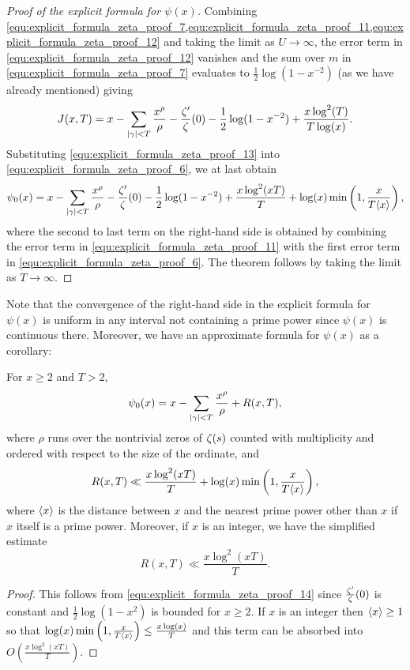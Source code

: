 \begin{proof}[Proof of the explicit formula for $\psi(x)$]
      Combining \cref{equ:explicit_formula_zeta_proof_7,equ:explicit_formula_zeta_proof_11,equ:explicit_formula_zeta_proof_12} and taking the limit as $U \to \infty$, the error term in \cref{equ:explicit_formula_zeta_proof_12} vanishes and the sum over $m$ in \cref{equ:explicit_formula_zeta_proof_7} evaluates to $\frac{1}{2}\log(1-x^{-2})$ (as we have already mentioned) giving
      \begin{equation}\label{equ:explicit_formula_zeta_proof_13}
        J(x,T) = x-\sum_{|\gamma| < T}\frac{x^{\rho}}{\rho}-\frac{\zeta'}{\zeta}(0)-\frac{1}{2}\log(1-x^{-2})+\frac{x\log^{2}(T)}{T\log(x)}.
      \end{equation}
      Substituting \cref{equ:explicit_formula_zeta_proof_13} into \cref{equ:explicit_formula_zeta_proof_6}, we at last obtain
      \begin{equation}\label{equ:explicit_formula_zeta_proof_14}
        \psi_{0}(x) = x-\sum_{|\gamma| < T}\frac{x^{\rho}}{\rho}-\frac{\zeta'}{\zeta}(0)-\frac{1}{2}\log(1-x^{-2})+\frac{x\log^{2}(xT)}{T}+\log(x)\min\left(1,\frac{x}{T\langle x\rangle}\right),
      \end{equation}
      where the second to last term on the right-hand side is obtained by combining the error term in \cref{equ:explicit_formula_zeta_proof_11} with the first error term in \cref{equ:explicit_formula_zeta_proof_6}. The theorem follows by taking the limit as $T \to \infty$.
    \end{proof}

    Note that the convergence of the right-hand side in the explicit formula for $\psi(x)$ is uniform in any interval not containing a prime power since $\psi(x)$ is continuous there. Moreover, we have an approximate formula for $\psi(x)$ as a corollary:

    \begin{corollary}\label{cor:explicit_formula_zeta_corollary}
      For $x \ge 2$ and $T > 2$,
      \[
        \psi_{0}(x) = x-\sum_{|\gamma| < T}\frac{x^{\rho}}{\rho}+R(x,T),
      \]
      where $\rho$ runs over the nontrivial zeros of $\zeta(s)$ counted with multiplicity and ordered with respect to the size of the ordinate, and
      \[
        R(x,T) \ll \frac{x\log^{2}(xT)}{T}+\log(x)\min\left(1,\frac{x}{T\langle x\rangle}\right),
      \]
      where $\langle x\rangle$ is the distance between $x$ and the nearest prime power other than $x$ if $x$ itself is a prime power. Moreover, if $x$ is an integer, we have the simplified estimate
      \[
        R(x,T) \ll \frac{x\log^{2}(xT)}{T}.
      \]
    \end{corollary}
    \begin{proof}
      This follows from \cref{equ:explicit_formula_zeta_proof_14} since $\frac{\zeta'}{\zeta}(0)$ is constant and $\frac{1}{2}\log(1-x^{2})$ is bounded for $x \ge 2$. If $x$ is an integer then $\langle x\rangle \ge 1$ so that $\log(x)\min\left(1,\frac{x}{T\langle x\rangle}\right) \le \frac{x\log(x)}{T}$ and this term can be absorbed into $O\left(\frac{x\log^{2}(xT)}{T}\right)$.
    \end{proof}

